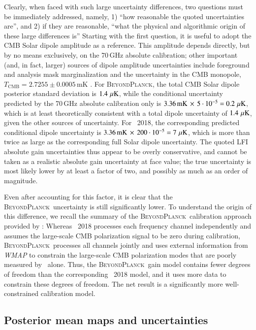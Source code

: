 \documentclass[twocolumn]{aa}
\newcommand{\BP}{\textsc{BeyondPlanck}}
\begin{document}
Clearly, when faced with such large uncertainty differences, two
questions must be immediately addressed, namely, 1) ``how reasonable 
the quoted uncertainties are'', and 2) if they are reasonable, ``what the
physical and algorithmic origin of these large differences is'' Starting
with the first question, it is useful to adopt the CMB Solar dipole
amplitude as a reference. This amplitude depends directly, but by no
means exclusively, on the 70\,GHz absolute calibration; other
important (and, in fact, larger) sources of dipole amplitude
uncertainties include foreground and analysis mask marginalization and
the uncertainty in the CMB monopole, $T_{\mathrm{CMB}} =
2.7255\pm0.0005\,\mathrm{mK}$ \citep{fixsen2009,bp11}. For \BP, the
total CMB Solar dipole posterior standard deviation is $1.4\,\muK$,
while the conditional uncertainty predicted by the 70\,GHz absolute
calibration only is $3.36\,\mathrm{mK}\,\times\, 5\cdot10^{-5} =
0.2\,\muK$, which is at least theoretically consistent with a total
dipole uncertainty of $1.4\,\muK$, given the other sources of
uncertainty. For \Planck\ 2018, the corresponding predicted
conditional dipole uncertainty is $3.36\,\mathrm{mK}\, \times\,
200\cdot10^{-5} = 7\,\muK$, which is more than twice as large as the
corresponding full Solar dipole uncertainty. The quoted LFI absolute
gain uncertainties thus appear to be overly conservative, and cannot
be taken as a realistic absolute gain uncertainty at face value; the
true uncertainty is most likely lower by at least a factor of two, and
possibly as much as an order of magnitude.

Even after accounting for this factor, it is clear that the
\BP\ uncertainty is still significantly lower. To understand the
origin of this difference, we recall the summary of the
\BP\ calibration approach provided by \citet{bp07}: Whereas
\Planck\ 2018 processes each frequency channel independently and
assumes the large-scale CMB polarization signal to be zero during
calibration, \BP\ processes all channels jointly and uses external
information from \emph{WMAP} to constrain the large-scale CMB
polarization modes that are poorly measured by \Planck\ alone. Thus,
the \BP\ gain model contains fewer degrees of freedom than the
corresponding \Planck\ 2018 model, and it uses more data to constrain
these degrees of freedom. The net result is a significantly more
well-constrained calibration model.

\subsection{Posterior mean maps and uncertainties}
\end{document}
